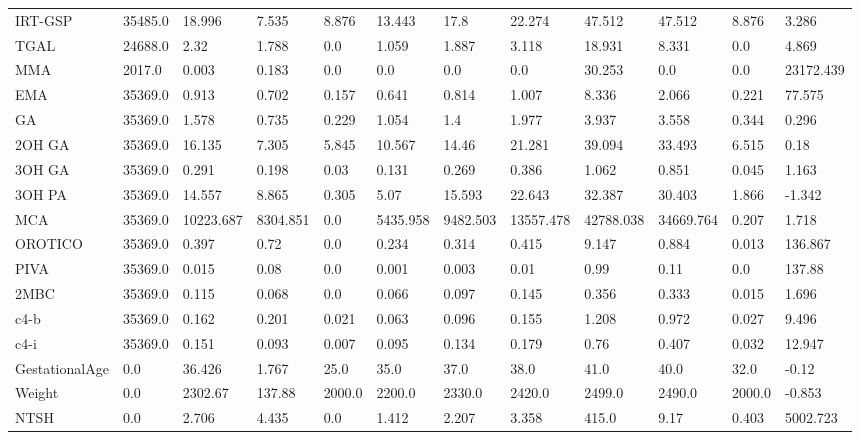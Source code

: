 \begin{tabular}{llllllllllll}
IRT-GSP & 35485.0 & 18.996 & 7.535 & 8.876 & 13.443 & 17.8 & 22.274 & 47.512 & 47.512 & 8.876 & 3.286 \\
TGAL & 24688.0 & 2.32 & 1.788 & 0.0 & 1.059 & 1.887 & 3.118 & 18.931 & 8.331 & 0.0 & 4.869 \\
MMA & 2017.0 & 0.003 & 0.183 & 0.0 & 0.0 & 0.0 & 0.0 & 30.253 & 0.0 & 0.0 & 23172.439 \\
EMA & 35369.0 & 0.913 & 0.702 & 0.157 & 0.641 & 0.814 & 1.007 & 8.336 & 2.066 & 0.221 & 77.575 \\
GA & 35369.0 & 1.578 & 0.735 & 0.229 & 1.054 & 1.4 & 1.977 & 3.937 & 3.558 & 0.344 & 0.296 \\
2OH GA & 35369.0 & 16.135 & 7.305 & 5.845 & 10.567 & 14.46 & 21.281 & 39.094 & 33.493 & 6.515 & 0.18 \\
3OH GA & 35369.0 & 0.291 & 0.198 & 0.03 & 0.131 & 0.269 & 0.386 & 1.062 & 0.851 & 0.045 & 1.163 \\
3OH PA & 35369.0 & 14.557 & 8.865 & 0.305 & 5.07 & 15.593 & 22.643 & 32.387 & 30.403 & 1.866 & -1.342 \\
MCA & 35369.0 & 10223.687 & 8304.851 & 0.0 & 5435.958 & 9482.503 & 13557.478 & 42788.038 & 34669.764 & 0.207 & 1.718 \\
OROTICO & 35369.0 & 0.397 & 0.72 & 0.0 & 0.234 & 0.314 & 0.415 & 9.147 & 0.884 & 0.013 & 136.867 \\
PIVA & 35369.0 & 0.015 & 0.08 & 0.0 & 0.001 & 0.003 & 0.01 & 0.99 & 0.11 & 0.0 & 137.88 \\
2MBC & 35369.0 & 0.115 & 0.068 & 0.0 & 0.066 & 0.097 & 0.145 & 0.356 & 0.333 & 0.015 & 1.696 \\
c4-b & 35369.0 & 0.162 & 0.201 & 0.021 & 0.063 & 0.096 & 0.155 & 1.208 & 0.972 & 0.027 & 9.496 \\
c4-i & 35369.0 & 0.151 & 0.093 & 0.007 & 0.095 & 0.134 & 0.179 & 0.76 & 0.407 & 0.032 & 12.947 \\
GestationalAge & 0.0 & 36.426 & 1.767 & 25.0 & 35.0 & 37.0 & 38.0 & 41.0 & 40.0 & 32.0 & -0.12 \\
Weight & 0.0 & 2302.67 & 137.88 & 2000.0 & 2200.0 & 2330.0 & 2420.0 & 2499.0 & 2490.0 & 2000.0 & -0.853 \\
NTSH & 0.0 & 2.706 & 4.435 & 0.0 & 1.412 & 2.207 & 3.358 & 415.0 & 9.17 & 0.403 & 5002.723 \\
\bottomrule
\end{tabular}
